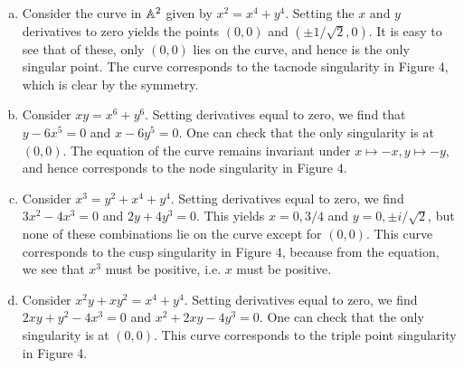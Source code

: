 \documentclass{mathnotes}
\begin{document}
\begin{enumerate}[(a)]
    \item Consider the curve in $\mathbb{A}^2$ given by $x^2=x^4+y^4$. Setting the $x$ and $y$ derivatives to zero
        yields the points $(0,0)$ and $(\pm 1/\sqrt{2},0)$. It is easy to see that of these, only $(0,0)$ lies
        on the curve, and hence is the only singular point. The curve corresponds to the tacnode singularity
        in Figure 4, which is clear by the symmetry.
    \item Consider $xy=x^6+y^6$. Setting derivatives equal to zero, we find that $y-6x^5=0$ and $x-6y^5=0$.
        One can check that the only singularity is at $(0,0)$.
        The equation of the curve remains invariant under $x\mapsto -x,y\mapsto -y$, and hence corresponds to
        the node singularity in Figure 4.
    \item Consider $x^3=y^2+x^4+y^4$. Setting derivatives equal to zero, we find $3x^2-4x^3=0$ and $2y+4y^3=0$.
        This yields $x=0,3/4$ and $y=0,\pm i/\sqrt{2}$, but none of these combinations lie on the curve except
        for $(0,0)$. This curve corresponds to the cusp singularity in Figure 4, because from the equation, we
        see that $x^3$ must be positive, i.e. $x$ must be positive.
    \item Consider $x^2y+xy^2=x^4+y^4$. Setting derivatives equal to zero, we find $2xy+y^2-4x^3=0$ and
        $x^2+2xy-4y^3=0$. One can check that the only singularity is at $(0,0)$. This curve corresponds to the
        triple point singularity in Figure 4.
\end{enumerate}
\end{document}
